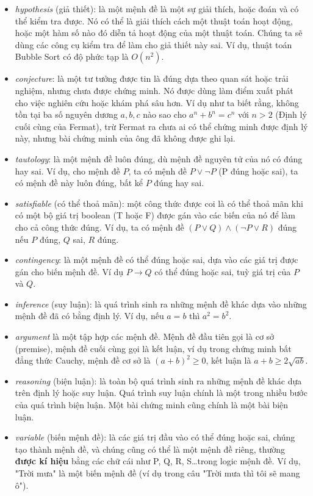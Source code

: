 \begin{itemize}
    \item \textit{hypothesis} (giả thiết): là một mệnh đề là một sự giải thích, hoặc đoán và có thể kiểm tra được. Nó có thể là giải thích cách một thuật toán hoạt động, hoặc một hàm số nào đó diễn tả hoạt động của một thuật toán. Chúng ta sẽ dùng các công cụ kiểm tra để làm cho giả thiết này sai. Ví dụ, thuật toán Bubble Sort có độ phức tạp là $O(n^2)$.
    \item \textit{conjecture}: là một tư tưởng được tin là đúng dựa theo quan sát hoặc trải nghiệm, nhưng chưa được chứng minh. Nó được dùng làm điểm xuất phát cho việc nghiên cứu hoặc khám phá sâu hơn. Ví dụ như ta biết rằng, không tồn tại ba số nguyên dương $a,b,c$ nào sao cho $a^n+b^n=c^n$ với $n>2$ (Định lý cuối cùng của Fermat), trừ Fermat ra chưa ai có thể chứng minh được định lý này, nhưng bài chứng minh của ông đã không được ghi lại.
    \item \textit{tautology}: là một mệnh đề luôn đúng, dù mệnh đề nguyên tử của nó có đúng hay sai. Ví dụ, cho mệnh đề $P$, ta có mệnh đề $P\lor\neg P$ (P đúng hoặc sai), ta có mệnh đề này luôn đúng, bất kể $P$ đúng hay sai.
    \item \textit{satisfiable} (có thể thoả mãn): một công thức được coi là có thể thoả mãn khi có một bộ giá trị boolean (T hoặc F) được gán vào các biến của nó để làm cho cả công thức đúng. Ví dụ, ta có mệnh đề $(P\lor Q)\land(\neg P\lor R)$ đúng nếu $P$ đúng, $Q$ sai, $R$ đúng.
    \item \textit{contingency}: là một mệnh đề có thể đúng hoặc sai, dựa vào các giá trị được gán cho biến mệnh đề. Ví dụ $P\rightarrow Q$ có thể đúng hoặc sai, tuỳ giá trị của $P$ và $Q$.
    \item \textit{inference} (suy luận): là quá trình sinh ra những mệnh đề khác dựa vào những mệnh đề đã có bằng định lý. Ví dụ, nếu $a=b$ thì $a^2=b^2$.
    \item \textit{argument} là một tập hợp các mệnh đề. Mệnh đề đầu tiên gọi là cơ sở (premise), mệnh đề cuối cùng gọi là kết luận, ví dụ trong chứng minh bất đẳng thức Cauchy, mệnh đề cơ sở là $(a+b)^2\geq0$, kết luận là $a+b\geq2\sqrt{ab}$.
    \item \textit{reasoning} (biện luận): là toàn bộ quá trình sinh ra những mệnh đề khác dựa trên định lý hoặc suy luận. Quá trình suy luận chính là một trong nhiều bước của quá trình biện luận. Một bài chứng minh cũng chính là một bài biện luận.
    \item \textit{variable} (biến mệnh đề): là các giá trị đầu vào có thể đúng hoặc sai, chúng tạo thành mệnh đề, và chúng cũng có thể là một mệnh đề riêng, thường \textbf{được kí hiệu} bằng các chữ cái như P, Q, R, S\dots trong logic mệnh đề. Ví dụ, "Trời mưa" là một biến mệnh đề (ví dụ trong câu "Trời mưa thì tôi sẽ mang ô").

\end{itemize}
